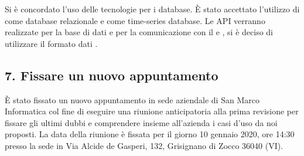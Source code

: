 	Si è concordato l'uso delle tecnologie per i database. È stato accettato l'utilizzo di  come database relazionale e  come time-series database. Le API verranno realizzate per la base di dati e per la comunicazione con il  e , si è deciso di utilizzare il formato dati .

	\subsection*{7. Fissare un nuovo appuntamento}

	È stato fissato un nuovo appuntamento in sede aziendale di San Marco Informatica col fine di eseguire una riunione anticipatoria alla prima revisione per fissare gli ultimi dubbi e comprendere insieme all'azienda i casi d'uso da noi proposti. La data della riunione è fissata per il giorno 10 gennaio 2020, ore 14:30 presso la sede in Via Alcide de Gasperi, 132, Grisignano di Zocco 36040 (VI).